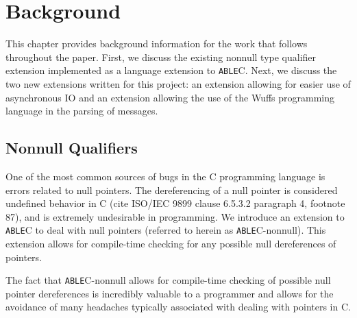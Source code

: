 \documentclass[main.tex]{subfiles}
\begin{document}
\section{Background}

This chapter provides background information for the work that follows
throughout the paper. First, we discuss the existing nonnull type qualifier
extension implemented as a language extension to \verb|ABLE|C. Next, we discuss
the two new extensions written for this project: an extension allowing for
easier use of asynchronous IO and an extension allowing the use of the Wuffs
programming language in the parsing of messages.

\subsection{Nonnull Qualifiers}
One of the most common sources of bugs in the C programming language is errors
related to null pointers. The dereferencing of a null pointer is considered
undefined behavior in C (cite ISO/IEC 9899 clause 6.5.3.2 paragraph 4, footnote
87), and is extremely undesirable in programming. We introduce an extension to
\verb|ABLE|C to deal with null pointers (referred to herein as
\verb|ABLE|C-nonnull). This extension allows for compile-time
checking for any possible null dereferences of pointers.

The fact that \verb|ABLE|C-nonnull allows for compile-time checking of possible
null pointer dereferences is incredibly valuable to a programmer and allows for
the avoidance of many headaches typically associated with dealing with pointers
in C.
\end{document}
